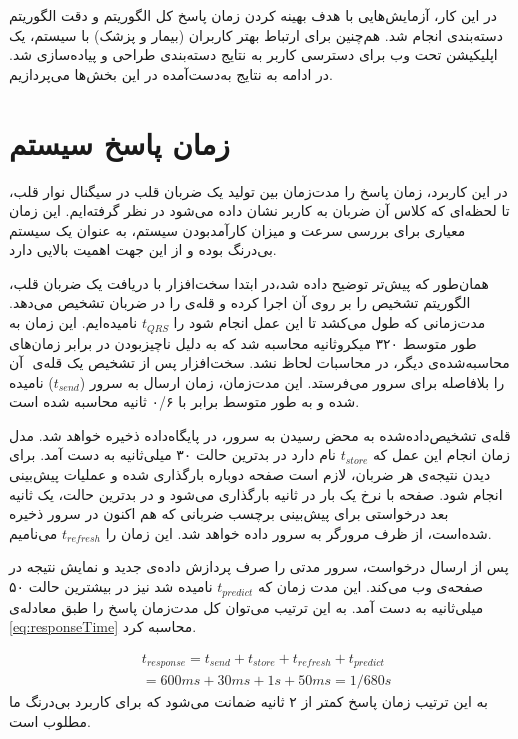 
\label{chap:result}
\pagebreak

در این کار، آزمایش‌هایی با هدف بهینه کردن زمان پاسخ کل الگوریتم و دقت الگوریتم دسته‌بندی انجام شد. هم‌چنین برای ارتباط بهتر کاربران (بیمار و پزشک) با سیستم، یک اپلیکیشن تحت وب برای دسترسی کاربر به نتایج دسته‌بندی طراحی و پیاده‌سازی شد. در ادامه به نتایج به‌دست‌آمده در این بخش‌ها می‌پردازیم.

\section{زمان پاسخ سیستم}
در این کاربرد، زمان پاسخ را مدت‌زمان بین تولید یک ضربان قلب در سیگنال نوار قلب، تا لحظه‌ای که کلاس آن ضربان به کاربر نشان داده می‌شود در نظر گرفته‌ایم. این زمان معیاری برای بررسی سرعت و میزان کارآمدبودن سیستم، به عنوان یک سیستم بی‌درنگ بوده و از این جهت اهمیت بالایی دارد. 

همان‌طور که پیش‌تر توضیح داده شد،در ابتدا سخت‌افزار با دریافت یک ضربان قلب، الگوریتم تشخیص  را بر روی آن اجرا کرده و قله‌ی  را در ضربان تشخیص می‌دهد. مدت‌زمانی که طول می‌کشد تا این عمل انجام شود را $t_{QRS}$ نامیده‌ایم. این زمان به طور متوسط ۳۲۰ میکروثانیه محاسبه شد که به دلیل ناچیزبودن در برابر زمان‌های محاسبه‌شده‌ی دیگر، در محاسبات لحاظ نشد. سخت‌افزار پس از تشخیص یک قله‌ی ‌ آن را بلافاصله برای سرور می‌فرستد. این مدت‌زمان، زمان ارسال به سرور ($t_{send}$) نامیده شده و به طور متوسط برابر با ۰/۶ ثانیه محاسبه شده است.

قله‌ی  تشخیص‌داده‌شده به محض رسیدن به سرور، در پایگاه‌داده ذخیره خواهد شد. مدل زمان انجام این عمل که $t_{store}$ نام دارد در  بدترین حالت ۳۰ میلی‌ثانیه به دست آمد. برای دیدن نتیجه‌ی هر ضربان، لازم است صفحه دوباره بارگذاری شده و عملیات پیش‌بینی انجام شود. صفحه با نرخ یک بار در ثانیه بارگذاری می‌شود و در بدترین حالت، یک ثانیه بعد درخواستی برای پیش‌بینی برچسب ضربانی که هم اکنون در سرور ذخیره شده‌است، از ظرف مرورگر به سرور داده خواهد شد. این زمان را $t_{refresh}$ می‌نامیم.

پس از ارسال درخواست، سرور مدتی را صرف پردازش داده‌ی جدید و نمایش نتیجه در صفحه‌ی وب می‌کند. این مدت زمان که $t_{predict}$ نامیده شد نیز در بیشترین حالت ۵۰ میلی‌ثانیه به دست آمد. به این ترتیب می‌توان کل مدت‌زمان پاسخ را طبق معادله‌ی \ref{eq:responseTime} محاسبه کرد.

\begin{equation}
\begin{split}
	& t_{response} = t_{send} + t_{store} + t_{refresh} + t_{predict} \\
	& = 600 ms + 30 ms + 1 s + 50 ms = 1/680 s
\end{split}
\label{eq:responseTime}
\end{equation}
به این ترتیب زمان پاسخ کمتر از ۲ ثانیه ضمانت می‌شود که برای کاربرد بی‌درنگ ما مطلوب است.
 
